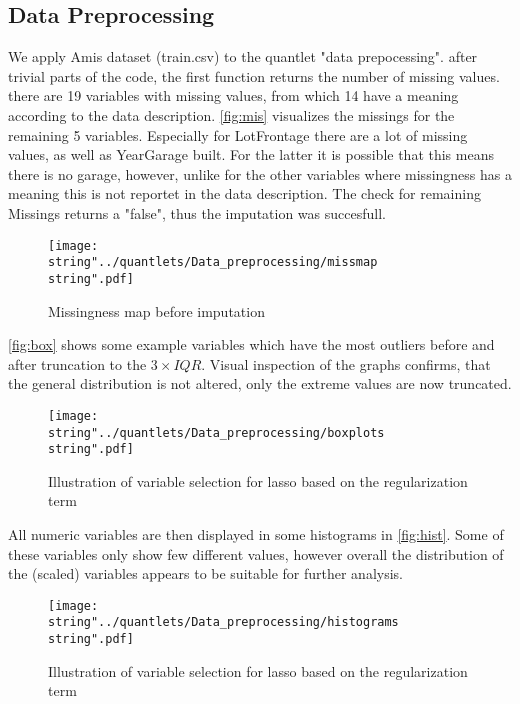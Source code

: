 
\subsection{Data Preprocessing}
We apply Amis dataset (train.csv) to the quantlet "data prepocessing".
after trivial parts of the code, the first function returns the number of missing values.  there are 19 variables with missing values, from which 14 have a meaning according to the data description. 
\autoref{fig:mis} visualizes the missings for the remaining 5 variables. Especially for LotFrontage there are a lot of missing values, as well as YearGarage built. For the latter it is possible that this means there is no garage, however, unlike for the other variables where missingness has a meaning this is not reportet in the data description. The check for remaining Missings returns a "false", thus the imputation was succesfull. 

\begin{figure}[H]
  \centering
\texttt{[image: \\string"../quantlets/Data\_preprocessing/missmap\\string".pdf]}
  \caption{Missingness map before imputation}\label{fig:mis}
\end{figure}
 
\autoref{fig:box} shows some example variables which have the most outliers before and after truncation to the $3 \times IQR$. Visual inspection of the graphs confirms, that the general distribution is not altered, only the extreme values are now truncated. 
\begin{figure}[H]
  \centering
\texttt{[image: \\string"../quantlets/Data\_preprocessing/boxplots\\string".pdf]}
  \caption{Illustration of variable selection for lasso based on the regularization term}\label{fig:box}
\end{figure}

All numeric variables are then displayed in some histograms in \autoref{fig:hist}. Some of these variables only show few different values, however overall the distribution of the (scaled) variables appears to be suitable for further analysis. 
 
\begin{figure}[H]
  \centering
\texttt{[image: \\string"../quantlets/Data\_preprocessing/histograms\\string".pdf]}
  \caption{Illustration of variable selection for lasso based on the regularization term}\label{fig:step}
\end{figure}

